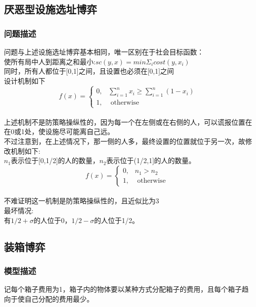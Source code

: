 \documentclass[11pt]{ctexart}
\begin{document}
\subsection{厌恶型设施选址博弈}

\subsubsection{问题描述}

问题与上述设施选址博弈基本相同，唯一区别在于社会目标函数：\\
使所有局中人到距离之和最小:$sc(y,x)=min\Sigma_i cost(y,x_i)$\\
同时，所有人都位于[0,1]之间，且设置也必须在[0,1]之间\\

设计机制如下\\
$$
f(x)=\left\{\begin{array}{lr}
0, & \sum_{i=1}^{n} x_{i} \geq \sum_{i=1}^{n}\left(1-x_{i}\right) \\
1, & \text { otherwise }
\end{array}\right.
$$\\
上述机制不是防策略操纵性的，因为每一个在左侧或在右侧的人，可以谎报位置在在0或1处，使设施尽可能离自己远。\\

不过注意到，在上述情况下，那一侧的人多，最终设置的位置就位于另一次，故修改机制如下:\\
$n_1$表示位于[0,1/2]的人的数量，$n_2$表示位于(1/2,1]的人的数量。
$$
f(x)=\left\{\begin{array}{lr}
0, & n_1>n_2 \\
1, & \text { otherwise }
\end{array}\right.
$$\\

不难证明这一机制是防策略操纵性的，且近似比为3\\

最坏情况:\\
有$1/2+\sigma$的人位于0，$1/2-\sigma$的人位于1/2。


\subsection{装箱博弈}

\subsubsection{模型描述}
记每个箱子费用为1，箱子内的物体要以某种方式分配箱子的费用，且每个箱子趋向于使自己分配的费用最少。\\
\end{document}
